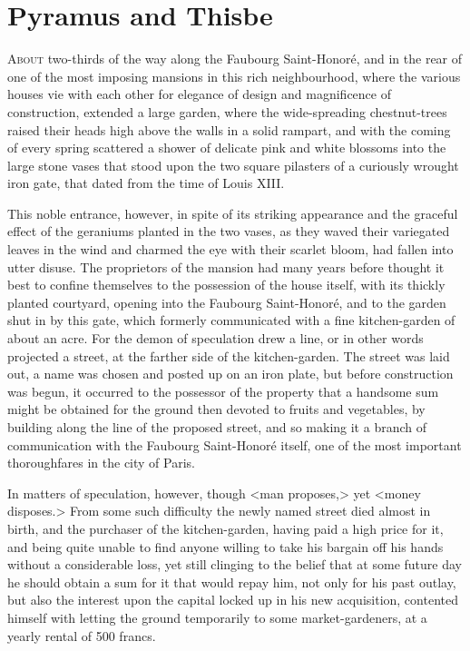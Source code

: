 \chapter{Pyramus and Thisbe} 

 \lettrine{A}{bout} two-thirds of the way along the Faubourg Saint-Honoré, and in the rear of one of the most imposing mansions in this rich neighbourhood, where the various houses vie with each other for elegance of design and magnificence of construction, extended a large garden, where the wide-spreading chestnut-trees raised their heads high above the walls in a solid rampart, and with the coming of every spring scattered a shower of delicate pink and white blossoms into the large stone vases that stood upon the two square pilasters of a curiously wrought iron gate, that dated from the time of Louis XIII. 

 This noble entrance, however, in spite of its striking appearance and the graceful effect of the geraniums planted in the two vases, as they waved their variegated leaves in the wind and charmed the eye with their scarlet bloom, had fallen into utter disuse. The proprietors of the mansion had many years before thought it best to confine themselves to the possession of the house itself, with its thickly planted courtyard, opening into the Faubourg Saint-Honoré, and to the garden shut in by this gate, which formerly communicated with a fine kitchen-garden of about an acre. For the demon of speculation drew a line, or in other words projected a street, at the farther side of the kitchen-garden. The street was laid out, a name was chosen and posted up on an iron plate, but before construction was begun, it occurred to the possessor of the property that a handsome sum might be obtained for the ground then devoted to fruits and vegetables, by building along the line of the proposed street, and so making it a branch of communication with the Faubourg Saint-Honoré itself, one of the most important thoroughfares in the city of Paris. 

 In matters of speculation, however, though <man proposes,> yet <money disposes.> From some such difficulty the newly named street died almost in birth, and the purchaser of the kitchen-garden, having paid a high price for it, and being quite unable to find anyone willing to take his bargain off his hands without a considerable loss, yet still clinging to the belief that at some future day he should obtain a sum for it that would repay him, not only for his past outlay, but also the interest upon the capital locked up in his new acquisition, contented himself with letting the ground temporarily to some market-gardeners, at a yearly rental of 500 francs. 

